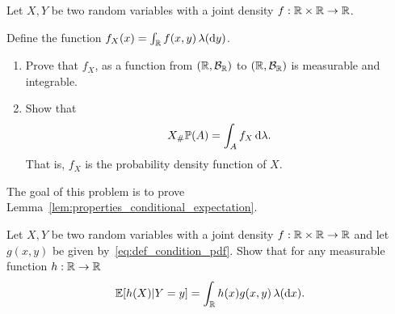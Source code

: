 \begin{problem}\label{prb:joint_pdfs}
Let $X,Y$ be two random variables with a joint density $f : \mathbb R \times \mathbb R \to \mathbb R$. 

Define the function $f_X(x) = \int_{\mathbb R} f(x,y) \, \lambda(\mathrm{d} y)$.
\begin{enumerate}[label={(\alph*)}]
\item Prove that $f_X$, as a function from $(\mathbb R, \mathcal B_{\mathbb R})$ to $(\mathbb R, \mathcal B_{\mathbb R})$ is measurable and integrable.
\item Show that
\[
	X_\# \mathbb P (A) = \int_A f_X \, \mathrm{d} \lambda.
\]
That is, $f_X$ is the probability density function of $X$.
\end{enumerate}
\end{problem}

%

\begin{problem}\label{prb:properties_conditional_expectation}
The goal of this problem is to prove Lemma~\ref{lem:properties_conditional_expectation}.
\end{problem}

\begin{problem}
Let $X,Y$ be two random variables with a joint density $f : \mathbb R \times \mathbb R \to \mathbb R$ and let $g(x,y)$ be given by~\eqref{eq:def_condition_pdf}. Show that for any measurable function $h : \mathbb R \to \mathbb R$
\[
	\mathbb E[h(X) | Y = y] = \int_{\mathbb R} h(x) g(x,y) \, \lambda(\mathrm{d} x).
\]
\end{problem}

